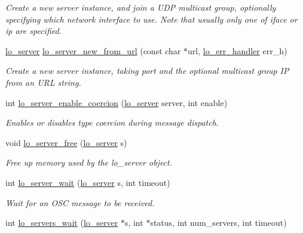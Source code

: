 \begin{DoxyCompactItemize}
\begin{DoxyCompactList}\small\item\em Create a new server instance, and join a U\+D\+P multicast group, optionally specifying which network interface to use. Note that usually only one of iface or ip are specified. \end{DoxyCompactList}\item 
\hyperlink{lo__types_8h_a59067bf50cf8abb4371da6f03c9036c9}{lo\+\_\+server} \hyperlink{group__liblolowlevel_ga1246a1f4a2ba967d31017452a32daf2a}{lo\+\_\+server\+\_\+new\+\_\+from\+\_\+url} (const char $\ast$url, \hyperlink{lo__types_8h_aa5d2e4aa0ff9d4459fcc76e7ed5839fc}{lo\+\_\+err\+\_\+handler} err\+\_\+h)
\begin{DoxyCompactList}\small\item\em Create a new server instance, taking port and the optional multicast group I\+P from an U\+R\+L string. \end{DoxyCompactList}\item 
int \hyperlink{group__liblolowlevel_ga175ef81fc2d695895967bfc30a495b2a}{lo\+\_\+server\+\_\+enable\+\_\+coercion} (\hyperlink{lo__types_8h_a59067bf50cf8abb4371da6f03c9036c9}{lo\+\_\+server} server, int enable)
\begin{DoxyCompactList}\small\item\em Enables or disables type coercion during message dispatch. \end{DoxyCompactList}\item 
void \hyperlink{group__liblolowlevel_gad3dc9193e1eef0d71a4b046242b64216}{lo\+\_\+server\+\_\+free} (\hyperlink{lo__types_8h_a59067bf50cf8abb4371da6f03c9036c9}{lo\+\_\+server} s)
\begin{DoxyCompactList}\small\item\em Free up memory used by the lo\+\_\+server object. \end{DoxyCompactList}\item 
int \hyperlink{group__liblolowlevel_ga33cdcfbab89d58f82175386a76698822}{lo\+\_\+server\+\_\+wait} (\hyperlink{lo__types_8h_a59067bf50cf8abb4371da6f03c9036c9}{lo\+\_\+server} s, int timeout)
\begin{DoxyCompactList}\small\item\em Wait for an O\+S\+C message to be received. \end{DoxyCompactList}\item 
int \hyperlink{group__liblolowlevel_gaa1821643c567abbdd681ccda349c4311}{lo\+\_\+servers\+\_\+wait} (\hyperlink{lo__types_8h_a59067bf50cf8abb4371da6f03c9036c9}{lo\+\_\+server} $\ast$s, int $\ast$status, int num\+\_\+servers, int timeout)

\end{DoxyCompactItemize}
